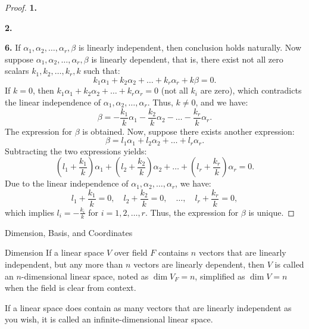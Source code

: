 \documentclass[11pt]{../../TexTemplate/elegantbook} %
\begin{document}
\begin{proof}

{\color{blue!60}\textbf{1.}}

{\color{blue!60}\textbf{2.}}

{\color{blue!60}\textbf{6.}} If \( \alpha_{1}, \alpha_{2}, \dots, \alpha_{r}, \beta \) is linearly independent, 
then conclusion holds naturally. 
\newline Now suppose \( \alpha_{1}, \alpha_{2}, \dots, \alpha_{r}, \beta \) is linearly dependent, 
that is, there exist not all zero scalars \( k_{1}, k_{2}, \dots, k_{r}, k \) such that:
\[
k_{1}\alpha_{1} + k_{2}\alpha_{2} + \dots + k_{r}\alpha_{r} + k\beta = 0.
\]
If \( k = 0 \), then \( k_{1}\alpha_{1} + k_{2}\alpha_{2} + \dots + k_{r}\alpha_{r} = 0 \)
(not all \( k_{i} \) are zero), which contradicts the linear independence of \( \alpha_{1}, \alpha_{2}, \dots, \alpha_{r} \).
\newline Thus, \( k \neq 0 \), and we have:
\[
\beta = -\frac{k_{1}}{k}\alpha_{1} - \frac{k_{2}}{k}\alpha_{2} - \dots - \frac{k_{r}}{k}\alpha_{r}.
\]
The expression for \( \beta \) is obtained. 
\newline Now, suppose there exists another expression:
\[
\beta = l_{1}\alpha_{1} + l_{2}\alpha_{2} + \dots + l_{r}\alpha_{r}.
\]
Subtracting the two expressions yields:
\[
\left( l_{1} + \frac{k_{1}}{k} \right)\alpha_{1} + \left( l_{2} + \frac{k_{2}}{k} \right)\alpha_{2} 
+ \dots + \left( l_{r} + \frac{k_{r}}{k} \right)\alpha_{r} = 0.
\]
Due to the linear independence of \( \alpha_{1}, \alpha_{2}, \dots, \alpha_{r} \), we have:
\[
l_{1} + \frac{k_{1}}{k} = 0, \quad l_{2} + \frac{k_{2}}{k} = 0, \quad \dots, \quad l_{r} + \frac{k_{r}}{k} = 0,
\]
which implies \( l_{i} = -\frac{k_{i}}{k} \) for \( i = 1, 2, \dots, r \).
Thus, the expression for \( \beta \) is unique.
\end{proof}


\begin{leftbarTitle}{Dimension, Basis, and Coordinates}\end{leftbarTitle}
\begin{definition}{Dimension}
    If a linear space \( V \) over field \(F\) contains \(n\) vectors that are linearly independent,
    but any more than \(n\) vectors are linearly dependent, 
    then \( V \) is called an \( n \)-dimensional linear space,
    noted as \( \dim V_{F} = n \), simplified as \( \dim V = n \) when the field is clear from context.

    If a linear space does contain as many vectors that are linearly independent as you wish, 
    it is called an infinite-dimensional linear space.
\end{definition}
\end{document}
